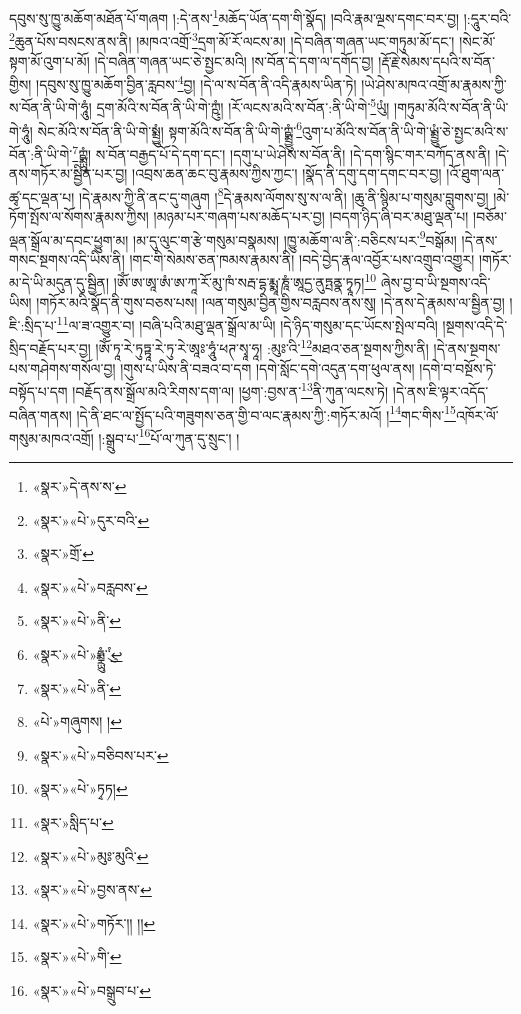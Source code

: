 དབུས་སུ་ཁྱུ་མཆོག་མཐོན་པོ་གཞག །:དེ་ནས་\footnote{«སྣར་»དེ་ནས་ས་}མཆོད་ཡོན་དག་གི་སྣོད། །བའི་རྣམ་ལྔས་དགང་བར་བྱ། །:དཱུར་བའི་\footnote{«སྣར་»«པེ་»དུར་བའི་}ཆུན་པོས་བསངས་ནས་ནི། །མཁའ་འགྲོ་\footnote{«སྣར་»གྲོ་}དྲག་མོ་རོ་ལངས་མ། །དེ་བཞིན་གཞན་ཡང་གཏུམ་མོ་དང་། །སེང་མོ་སྟག་མོ་འུག་པ་མོ། །དེ་བཞིན་གཞན་ཡང་ཅེ་སྤྱང་མའི། །ས་བོན་དེ་དག་ལ་དགོད་བྱ། །རྡོ་རྗེ་སེམས་དཔའི་ས་བོན་གྱིས། །དབུས་སུ་ཁྱུ་མཆོག་བྱིན་རླབས་\footnote{«སྣར་»«པེ་»བརླབས་}བྱ། །དེ་ལ་ས་བོན་ནི་འདི་རྣམས་ཡིན་ཏེ། །ཡེ་ཤེས་མཁའ་འགྲོ་མ་རྣམས་ཀྱི་ས་བོན་ནི་ཡི་གེ་ཧཱུཾ། དྲག་མོའི་ས་བོན་ནི་ཡི་གེ་ཀྵུཾ། །རོ་ལངས་མའི་ས་བོན་:ནི་ཡི་གེ་\footnote{«སྣར་»«པེ་»ནི་}ཡུཾ། །གཏུམ་མོའི་ས་བོན་ནི་ཡི་གེ་ཧཱུཾ། སེང་མོའི་ས་བོན་ནི་ཡི་གེ་སྨྲྱུཾ། སྟག་མོའི་ས་བོན་ནི་ཡི་གེ་ཀྵྨྲྱུཾ་\footnote{«སྣར་»«པེ་»ཧྨྼྻུཾ་ུཾ་}འུག་པ་མོའི་ས་བོན་ནི་ཡི་གེ་ཡྨྲྱུཾ་ཅེ་སྤྱང་མའི་ས་བོན་:ནི་ཡི་གེ་\footnote{«སྣར་»«པེ་»ནི་}ཀྵྨྻུཾ། ས་བོན་བརྒྱད་པོ་དེ་དག་དང་། །དགུ་པ་ཡེ་ཤེས་ས་བོན་ནི། །དེ་དག་སྙིང་གར་བཀོད་ནས་ནི། །དེ་ནས་གཏོར་མ་སྦྱིན་པར་བྱ། །འབྲས་ཆན་ཆང་བུ་རྣམས་ཀྱིས་ཀྱང་། །སྣོད་ནི་དགུ་དག་དགང་བར་བྱ། །འོ་ཐུག་ལན་ཚྭ་དང་ལྡན་པ། །དེ་རྣམས་ཀྱི་ནི་ནང་དུ་གཞུག །\footnote{«པེ་»གཞུགས། །}དེ་རྣམས་ལོགས་སུ་ས་ལ་ནི། །ཆུ་ནི་སྙིམ་པ་གསུམ་བླུགས་བྱ། །མེ་ཏོག་སྤོས་ལ་སོགས་རྣམས་ཀྱིས། །མཉམ་པར་གཞག་པས་མཆོད་པར་བྱ། །བདག་ཉིད་ཞི་བར་མཐུ་ལྡན་པ། །བཅོམ་ལྡན་སྒྲོལ་མ་དབང་ཕྱུག་མ། །མ་དུ་ལུང་ག་རྩེ་གསུམ་བསྣམས། །ཁྱུ་མཆོག་ལ་ནི་:བཅིངས་པར་\footnote{«སྣར་»«པེ་»བཅིབས་པར་}བསྒོམ། །དེ་ནས་གསང་སྔགས་འདི་ཡིས་ནི། །གང་གི་སེམས་ཅན་ཁམས་རྣམས་ནི། །བདེ་བྱེད་རྣལ་འབྱོར་པས་འགྲུབ་འགྱུར། །གཏོར་མ་དེ་ཡི་མདུན་དུ་སྦྱིན། །ཨོཾ་ཨ་ཨཱ་ཨཾ་ཨ་ཀཱ་རོ་མུ་ཁཾ་སརྦ་དྷ་རྨྨཱ་ཎཱཾ་ཨཱདྱ་ནུཏྤནྣ་ཏྭཱཏ།\footnote{«སྣར་»«པེ་»ཏྭཏ།} ཞེས་བྱ་བ་ཡི་སྔགས་འདི་ཡིས། །གཏོར་མའི་སྣོད་ནི་གུས་བཅས་པས། །ལན་གསུམ་བྱིན་གྱིས་བརླབས་ནས་སུ། །དེ་ནས་དེ་རྣམས་ལ་སྦྱིན་བྱ། །ཇི་:སྲིད་པ་\footnote{«སྣར་»སླིད་པ་}ལ་ཟ་འགྱུར་བ། །བཞི་པའི་མཐུ་ལྡན་སྒྲོལ་མ་ཡི། །དེ་ཉིད་གསུམ་དང་ཡོངས་སྤེལ་བའི། །སྔགས་འདི་དེ་སྲིད་བརྗོད་པར་བྱ། །ཨོཾ་ཏཱ་རེ་ཏུཏྟཱ་རེ་ཏུ་རེ་ཨཱཿ་ཧཱུཾ་ཕཊ་སྭཱ་ཧཱ། :མུཿ་འི་\footnote{«སྣར་»«པེ་»མུཿ་མུའི་}མཐའ་ཅན་སྔགས་ཀྱིས་ནི། །དེ་ནས་སྔགས་པས་གཤེགས་གསོལ་བྱ། །གུས་པ་ཡིས་ནི་བཟའ་བ་དག །དགེ་སློང་དགེ་འདུན་དག་ཕུལ་ནས། །དགེ་བ་བསྔོས་ཏེ་བསྟོད་པ་དག །བརྗོད་ནས་སྒྲོལ་མའི་རིགས་དག་ལ། །ཕྱག་:བྱས་ན་\footnote{«སྣར་»«པེ་»བྱས་ནས་}ནི་ཀུན་ལངས་ཏེ། །དེ་ནས་ཇི་ལྟར་འདོད་བཞིན་གནས། །དེ་ནི་ཐང་ལ་སྤྱོད་པའི་གཟུགས་ཅན་གྱི་བ་ལང་རྣམས་ཀྱི་:གཏོར་མའོ། །\footnote{«སྣར་»«པེ་»གཏོར་།། །།}གང་གིས་\footnote{«སྣར་»«པེ་»གི་}འཁོར་ལོ་གསུམ་མཁའ་འགྲོ། །:སྒྲུབ་པ་\footnote{«སྣར་»«པེ་»བསྒྲུབ་པ་}པོ་ལ་ཀུན་དུ་སྲུང་། །
